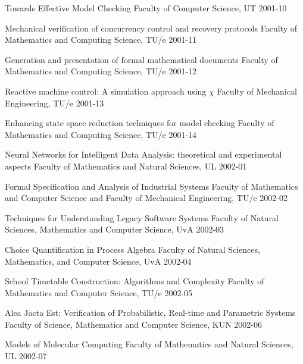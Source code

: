 \begin{multicols}{2}
         {Towards Effective Model Checking}
         {Faculty of Computer Science, UT}
         {2001-10}

         {Mechanical verification of concurrency control and recovery protocols}
         {Faculty of Mathematics and Computing Science, TU/e}
         {2001-11}

         {Generation and presentation of formal mathematical documents}
         {Faculty of Mathematics and Computing Science, TU/e}
         {2001-12}

         {Reactive machine control: A simulation approach using $\chi$}
         {Faculty of Mechanical Engineering, TU/e}
         {2001-13}

         {Enhancing state space reduction techniques for model checking}
         {Faculty of Mathematics and Computing Science, TU/e}
         {2001-14}

         {Neural Networks for Intelligent Data Analysis: theoretical and
      experimental aspects}
         {Faculty of Mathematics and Natural Sciences, UL}
         {2002-01}

         {Formal Specification and Analysis of Industrial Systems}
         {Faculty of Mathematics and Computer Science and Faculty of Mechanical Engineering, TU/e}
         {2002-02}

         {Techniques for Understanding Legacy Software Systems}
         {Faculty of Natural Sciences, Mathematics and Computer
          Science, UvA}
         {2002-03}

         {Choice Quantification in Process Algebra}
         {Faculty of Natural Sciences, Mathematics, and Computer Science, UvA}
         {2002-04}

         {School Timetable Construction: Algorithms and Complexity}
         {Faculty of Mathematics and Computer Science, TU/e}
         {2002-05}

         {Alea Jacta Est: Verification of Probabilistic, Real-time and Parametric Systems}
         {Faculty of Science, Mathematics and Computer Science, KUN}
         {2002-06}

     {Models of Molecular Computing}
         {Faculty of Mathematics and Natural Sciences, UL}
         {2002-07}


\end{multicols}
